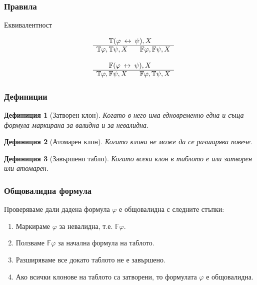 \documentclass{beamer}
\newtheorem{defn}{Дефиниция}[section]
\newcommand{\signT}{\mathbb{T}}
\newcommand{\signF}{\mathbb{F}}
\begin{document}
\begin{frame}\frametitle{Правила}
Еквивалентност
		\noindent\begin{minipage}{.5\linewidth}
		\begin{align*}
			\begin{array}{rl}
				& \:\:\:\:\:\:\:\: \signT(\varphi \: \leftrightarrow \: \psi), X \\
			      \cline{2-2}
			      & \signT\varphi, \signT\psi, X \:\:\:\:\:\:\:\: \signF\varphi, \signF\psi, X
			\end{array}
		\end{align*}
		\end{minipage}%
		\begin{minipage}{.5\linewidth}
		\begin{align*}
			\begin{array}{rl}
				& \:\:\:\:\:\:\:\: \signF(\varphi \: \leftrightarrow \: \psi), X \\
			      \cline{2-2}
			      & \signT\varphi, \signF\psi, X \:\:\:\:\:\:\:\: \signF\varphi, \signT\psi, X
			\end{array}
		\end{align*}
		\end{minipage}
\end{frame}

\begin{frame}\frametitle{Дефиниции}

\begin{defn}[Затворен клон]
Когато в него има едновременно една и съща формула маркирана за валидна и за невалидна.
\end{defn}

\begin{defn}[Атомарен клон]
Когато клона не може да се разширява повече.
\end{defn}

\begin{defn}[Завършено табло]
Когато всеки клон в таблото е или затворен или атомарен.
\end{defn}
\end{frame}

\begin{frame}\frametitle{Общовалидна формула}
	Проверяваме дали дадена формула $\varphi$ е общовалидна с следните стъпки:
\begin{enumerate}
	\item Маркираме $\varphi$ за невалидна, т.е.  $\signF\varphi$.
	\item Ползваме $\signF\varphi$ за начална формула на таблото.
	\item Разширяваме все докато таблото не е завършено.
	\item Ако всички клонове на таблото са затворени, то формулата $\varphi$ е общовалидна.
\end{enumerate}
\end{frame}
\end{document}

